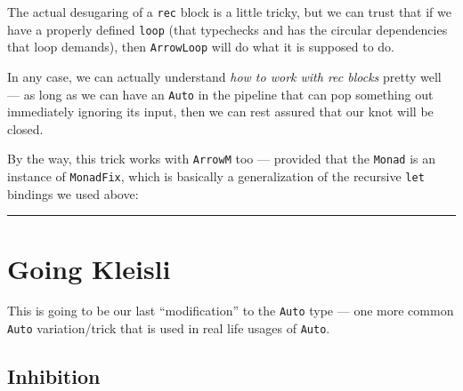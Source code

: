 \documentclass[]{article}
\newenvironment{Shaded}{}{}
\newcommand{\CommentTok}[1]{\textcolor[rgb]{0.38,0.63,0.69}{\textit{#1}}}
\newcommand{\DataTypeTok}[1]{\textcolor[rgb]{0.56,0.13,0.00}{#1}}
\newcommand{\FunctionTok}[1]{\textcolor[rgb]{0.02,0.16,0.49}{#1}}
\newcommand{\KeywordTok}[1]{\textcolor[rgb]{0.00,0.44,0.13}{\textbf{#1}}}
\newcommand{\NormalTok}[1]{#1}
\newcommand{\OtherTok}[1]{\textcolor[rgb]{0.00,0.44,0.13}{#1}}
\begin{document}
The actual desugaring of a \texttt{rec} block is a little tricky, but we can
trust that if we have a properly defined \texttt{loop} (that typechecks and has
the circular dependencies that loop demands), then \texttt{ArrowLoop} will do
what it is supposed to do.

In any case, we can actually understand \emph{how to work with rec blocks}
pretty well --- as long as we can have an \texttt{Auto} in the pipeline that can
pop something out immediately ignoring its input, then we can rest assured that
our knot will be closed.

By the way, this trick works with \texttt{ArrowM} too --- provided that the
\texttt{Monad} is an instance of \texttt{MonadFix}, which is basically a
generalization of the recursive \texttt{let} bindings we used above:

\begin{Shaded}
\end{Shaded}

\begin{center}\rule{0.5\linewidth}{\linethickness}\end{center}

\hypertarget{going-kleisli}{%
\section{Going Kleisli}\label{going-kleisli}}

This is going to be our last ``modification'' to the \texttt{Auto} type --- one
more common \texttt{Auto} variation/trick that is used in real life usages of
\texttt{Auto}.

\hypertarget{inhibition}{%
\subsection{Inhibition}\label{inhibition}}
\end{document}
